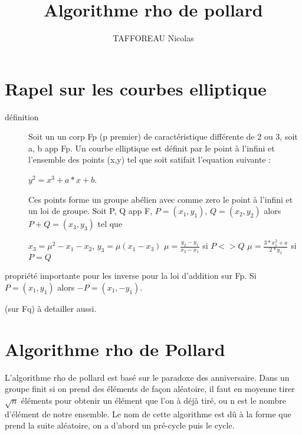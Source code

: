 \documentclass[a4paper,10pt]{report}
\title{Algorithme rho de pollard}
\author{TAFFOREAU Nicolas}
\begin{document}
\maketitle
\tableofcontents

\chapter{Rapel sur les courbes elliptique}
\begin{description}
  \item[définition]

    Soit un un corp Fp (p premier) de caractéristique différente de 2 ou 3, soit a, b app Fp. Un courbe elliptique est définit par
    le point à l'infini et l'ensemble des points (x,y) tel que soit satifait l'equation suivante :
  \begin{center}
    $y^2 = x^3 + a*x + b$.   
  \end{center}
  Ces points forme un groupe abélien avec comme zero le point à l'infini et un loi de groupe.
  Soit P, Q app F, $ P = (x_1,y_1)$, $Q = (x_2,y_2)$ alors $P+Q = (x_3,y_3)$ tel que 
    \begin{center}
      $x_3 = \mu^2 -x_1 - x_2$, $y_3 = \mu(x_1-x_3)$
      \newline
      $\mu = \frac{y_2 - y_1}{x_2 - x_1}$ si $P <> Q$
      \newline
      $\mu = \frac{3*x_1^2 + a}{2*y_1}$ si $P = Q$
    \end{center}

\end{description}

propriété importante pour les inverse pour la loi d'addition sur Fp. Si $P = (x_1,y_1)$ alors $-P = (x_1,-y_1)$.

(sur Fq)  à detailler aussi.

\chapter{Algorithme rho de Pollard}

L'algorithme rho de pollard est basé sur le paradoxe des anniversaire. Dans un groupe finit si on prend des éléments de façon aléatoire,
il faut en moyenne tirer $\sqrt{n}$ éléments pour obtenir un élément que l'on à déjà tiré, ou n est le nombre d'élément de notre ensemble.
Le nom de cette algorithme est dû à la forme que prend la suite aléatoire, on a d'abord un pré-cycle puis le cycle.
\end{document}
